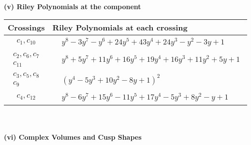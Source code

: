\documentclass[1p]{elsarticle_modified}
\theoremstyle{definition}
\begin{document}
\newpage\renewcommand{\arraystretch}{1}
\flushleft \textbf{(v) Riley Polynomials at the component}\newline \\
\begin{tabular}{m{50pt}|m{274pt}}
Crossings & \hspace{64pt}Riley Polynomials at each crossing \\
\hline $$\begin{aligned}c_{1},c_{10}\end{aligned}$$&$\begin{aligned}
&y^8-3 y^7- y^6+24 y^5+43 y^4+24 y^3- y^2-3 y+1
\end{aligned}$\\
\hline $$\begin{aligned}c_{2},c_{6},c_{7}\\c_{11}\end{aligned}$$&$\begin{aligned}
&y^8+5 y^7+11 y^6+16 y^5+19 y^4+16 y^3+11 y^2+5 y+1
\end{aligned}$\\
\hline $$\begin{aligned}c_{3},c_{5},c_{8}\\c_{9}\end{aligned}$$&$\begin{aligned}
&(y^4-5 y^3+10 y^2-8 y+1)^2
\end{aligned}$\\
\hline $$\begin{aligned}c_{4},c_{12}\end{aligned}$$&$\begin{aligned}
&y^8-6 y^7+15 y^6-11 y^5+17 y^4-5 y^3+8 y^2- y+1
\end{aligned}$\\
\hline
\end{tabular}\\~\\
\newpage\flushleft \textbf{(vi) Complex Volumes and Cusp Shapes}
\end{document}

